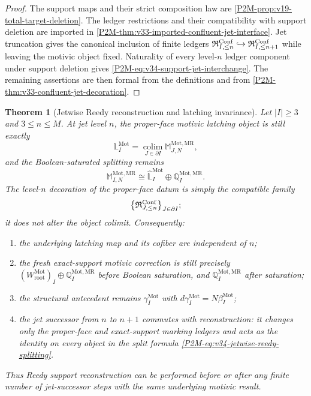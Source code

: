 \documentclass[11pt]{article}
\newtheorem{theorem}{Theorem}[section]
\theoremstyle{remark}
\newcommand{\Mot}{\mathrm{Mot}}
\newcommand{\rootc}{\mathrm{root}}
\newcommand{\MR}{\mathrm{MR}}
\begin{document}
\begin{proof}
The support maps and their strict composition law are
\cref{P2M-prop:v19-total-target-deletion}.  The ledger restrictions and their
compatibility with support deletion are imported in
\cref{P2M-thm:v33-imported-confluent-jet-interface}.  Jet truncation gives the
canonical inclusion of finite ledgers
$\mathfrak R^{\rm Conf}_{I,\le n}\hookrightarrow
\mathfrak R^{\rm Conf}_{I,\le n+1}$ while leaving the motivic object fixed.
Naturality of every level-$n$ ledger component under support deletion gives
\eqref{P2M-eq:v34-support-jet-interchange}.  The remaining assertions are then
formal from the definitions and from
\cref{P2M-thm:v33-confluent-jet-decoration}.
\end{proof}

\begin{theorem}[Jetwise Reedy reconstruction and latching invariance]
\label{P2M-thm:v34-jetwise-reedy-reconstruction}
Let $|I|\ge3$ and $3\le n\le M$.  At jet level $n$, the proper-face motivic
latching object is still exactly
\[
 \mathbb L_I^{\Mot}
 =\operatorname*{colim}_{J\in\partial I}
   \mathbb M_{J,N}^{\Mot,\MR},
\]
and the Boolean-saturated splitting remains
\begin{equation}
 \boxed{
 \mathbb M_{I,N}^{\Mot,\MR}
 \cong
 \widehat{\mathbb L}_I^{\Mot}
 \oplus\mathbb Q_I^{\Mot,\MR}.}
 \label{P2M-eq:v34-jetwise-reedy-splitting}
\end{equation}
The level-$n$ decoration of the proper-face datum is simply the compatible
family
\[
 \bigl\{\mathfrak R^{\rm Conf}_{J,\le n}\bigr\}_{J\in\partial I};
\]
it does not alter the object colimit.  Consequently:
\begin{enumerate}[label=\textup{(\roman*)}]
\item the underlying latching map and its cofiber are independent of $n$;
\item the fresh exact-support motivic correction is still precisely
$(W_{\rootc}^{\Mot})_I\oplus\mathbb Q_I^{\Mot,\MR}$ before Boolean saturation,
and $\mathbb Q_I^{\Mot,\MR}$ after saturation;
\item the structural antecedent remains $\gamma_I^{\Mot}$ with
$d\gamma_I^{\Mot}=N\beta_I^{\Mot}$;
\item the jet successor from $n$ to $n+1$ commutes with reconstruction: it
changes only the proper-face and exact-support marking ledgers and acts as the
identity on every object in the split formula
\eqref{P2M-eq:v34-jetwise-reedy-splitting}.
\end{enumerate}
Thus Reedy support reconstruction can be performed before or after any finite
number of jet-successor steps with the same underlying motivic result.
\end{theorem}
\end{document}
